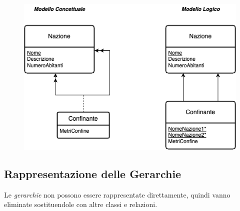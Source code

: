 \begin{figure}[H]
    \centering
    \includegraphics[scale=0.55]{img/ricorsionemoltimolti.png}
\end{figure}

\subsection{Rappresentazione delle Gerarchie}
Le \emph{gerarchie} non possono essere rappresentate direttamente, quindi
vanno eliminate sostituendole con altre classi e relazioni.

